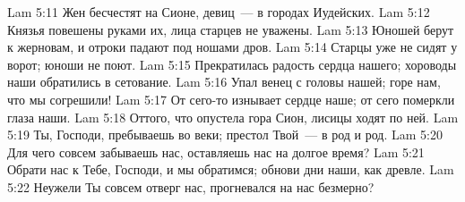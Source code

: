 \vs Lam 5:11 Жен бесчестят на Сионе, девиц~--- в городах Иудейских.
\vs Lam 5:12 Князья повешены руками их, лица старцев не уважены.
\vs Lam 5:13 Юношей берут к жерновам, и отроки падают под ношами дров.
\vs Lam 5:14 Старцы уже не сидят у ворот; юноши не поют.
\vs Lam 5:15 Прекратилась радость сердца нашего; хороводы наши обратились в сетование.
\vs Lam 5:16 Упал венец с головы нашей; горе нам, что мы согрешили!
\vs Lam 5:17 От сего-то изнывает сердце наше; от сего померкли глаза наши.
\vs Lam 5:18 Оттого, что опустела гора Сион, лисицы ходят по ней.
\vs Lam 5:19 Ты, Господи, пребываешь во веки; престол Твой~--- в род и род.
\vs Lam 5:20 Для чего совсем забываешь нас, оставляешь нас на долгое время?
\vs Lam 5:21 Обрати нас к Тебе, Господи, и мы обратимся; обнови дни наши, как древле.
\vs Lam 5:22 Неужели Ты совсем отверг нас, прогневался на нас безмерно?
